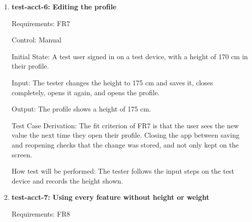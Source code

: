 \documentclass[12pt, titlepage]{article}
\begin{document}
\begin{enumerate}
Input: A password reset request for \texttt{sam@fitfolio.test}. The test opens
the link in the email the mailbox receives and sets the new password
\texttt{Swim2027lap}. It then signs in with each password.

Output: The mailbox receives exactly one email, addressed to
\texttt{sam@fitfolio.test} and containing a reset link. After the reset,
signing in with \texttt{Walk2026run} is refused and signing in with
\texttt{Swim2027lap} succeeds. The account for \texttt{jordan@fitfolio.test}
receives no email and its password is unchanged.

Test Case Derivation: FR6 (Hazard Analysis, SEC-40) sends the link to the
account's own email address, and its fit criterion is that the user can then
sign in only with the new password. Checking the old password catches a reset
that adds a new password without removing the old one. The second account
checks that a reset for one account does not reach or change another.

How test will be performed: A pytest test sends the reset request, reads the
email from the test mailbox, follows the link through the API, and sends the
sign-in requests.

\item{\textbf{test-acct-6: Editing the profile}\\}

Requirements: FR7

Control: Manual

Initial State: A test user signed in on a test device, with a height of 170
cm in their profile.

Input: The tester changes the height to 175 cm and saves it, closes
\progname{} completely, opens it again, and opens the profile.

Output: The profile shows a height of 175 cm.

Test Case Derivation: The fit criterion of FR7 is that the user sees the new
value the next time they open their profile. Closing the app between saving
and reopening checks that the change was stored, and not only kept on the
screen.

How test will be performed: The tester follows the input steps on the test
device and records the height shown.

\item{\textbf{test-acct-7: Using every feature without height or weight}\\}

Requirements: FR8


\end{enumerate}
\end{document}
